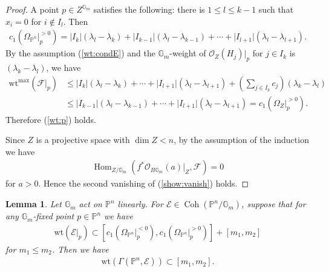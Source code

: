 \documentclass [11pt,oneside,a4paper,mathscr]{amsart}
\newtheorem{lemma}[thm]{Lemma}
\theoremstyle{definition}
\renewcommand{\leq}{\leqslant}
\newcommand{\bgm}{B\mathbb{G}_m}
\newcommand{\Coh}{\operatorname{Coh}}
\newcommand{\Hom}{\operatorname{Hom}}
\newcommand{\wt}{\mathrm{wt}}
\begin{document}
\begin{proof}
    A point $p \in Z^{\mathbb{G}_m}$ satisfies 
    the following: there is $1\leq l \leq k-1$ such that 
    $x_i=0$ for $i\notin I_l$. 
    Then 
    \begin{align*}
        c_1(\Omega_{\mathbb{P}^n}|_p^{>0})=
        \lvert I_k \rvert (\lambda_l-\lambda_k)+
         \lvert I_{k-1} \rvert (\lambda_l-\lambda_{k-1})+
        \cdots+
        \lvert I_{l+1} \rvert (\lambda_l-\lambda_{l+1}). 
    \end{align*}
    By the assumption (\ref{wt:condE}) and the $\mathbb{G}_m$-weight of $\mathcal{O}_Z(H_j)|_p$ for $j\in I_k$ is 
    $(\lambda_k-\lambda_l)$, 
    we have 
    \begin{align*}
        \wt^{\mathrm{max}}(\mathcal{F}|_p)
        &\leq \lvert I_k\rvert(\lambda_l-\lambda_k)
        +\cdots+\lvert I_{l+1}\rvert (\lambda_l-\lambda_{l+1})
        +\left(\sum_{j\in I_k}c_j\right)(\lambda_k-\lambda_l) \\
        &\leq \lvert I_{k-1}\rvert(\lambda_l-\lambda_{k-1})
        +\cdots+\lvert I_{l+1}\rvert (\lambda_l-\lambda_{l+1}) =c_1(\Omega_{Z}|^{>0}_{p}).        
    \end{align*}
    Therefore (\ref{wt:p}) holds. 
    
    Since $Z$ is a projective space with 
    $\dim Z<n$, by the 
    assumption of the induction we have 
    \begin{align*}\Hom_{Z/\mathbb{G}_m}(f^{\ast}\mathcal{O}_{\bgm}(a)|_{Z}, 
    \mathcal{F})=0
    \end{align*}
    for $a>0$. Hence the second vanishing of (\ref{show:vanish}) holds.
\end{proof}
\begin{lemma}\label{lem:wtbound}
Let $\mathbb{G}_m$ act on $\mathbb{P}^n$ linearly. 
For $\mathcal{E} \in \Coh(\mathbb{P}^n/\mathbb{G}_m)$, 
suppose that for any $\mathbb{G}_m$-fixed point 
$p \in \mathbb{P}^n$ we have 
\begin{align*}
    \wt(\mathcal{E}|_{p}) \subset \left[c_1 (\Omega_{\mathbb{P}^n}|_{p}^{<0}), 
    c_1 (\Omega_{\mathbb{P}^n}|_{p}^{>0})
    \right]+[m_1, m_2]
\end{align*}
for $m_1 \leq m_2$. 
Then we have 
\begin{align*}
    \wt(\Gamma(\mathbb{P}^n, \mathcal{E}))
    \subset [m_1, m_2]. 
\end{align*}
\end{lemma}
\end{document}
